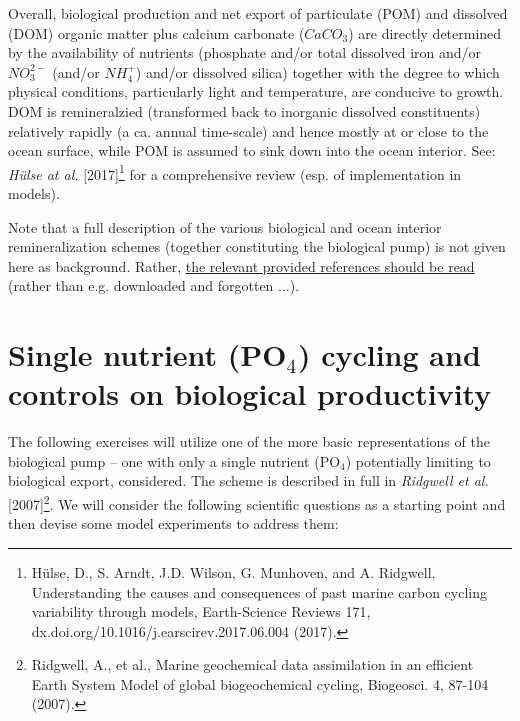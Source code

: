 \documentclass[11pt,fleqn]{book} %
\begin{document}
Overall, biological production and net export of particulate (POM) and dissolved (DOM) organic matter plus calcium carbonate (\(CaCO_{3}\)) are directly determined by the availability of nutrients (phosphate and/or total dissolved iron and/or \(NO^{2-}_{3}\) (and/or \(NH^{+}_{4}\)) and/or dissolved silica) together with the degree to which physical conditions, particularly light and temperature, are conducive to growth. DOM is remineralzied (transformed back to inorganic dissolved constituents) relatively rapidly (a ca. annual time-scale) and hence mostly at or close to the ocean surface, while POM is assumed to sink down into the ocean interior. See: \textit{Hülse at al.} [2017]\footnote{Hülse, D., S. Arndt, J.D. Wilson, G. Munhoven, and A. Ridgwell, Understanding the causes and consequences of past marine carbon cycling variability through models, Earth-Science Reviews 171, dx.doi.org/10.1016/j.earscirev.2017.06.004 (2017).} for a comprehensive review (esp. of implementation in models).

Note that a full description of the various biological and ocean interior remineralization schemes (together constituting the biological pump) is not given here as background. Rather, \uline{the relevant provided references should be read} (rather than e.g. downloaded and forgotten ...).


\newpage


\section{Single nutrient (PO$_{4}$) cycling and controls on biological productivity}

The following exercises  will utilize one of the more basic representations of the biological pump -- one with only a single nutrient (PO$_{4}$) potentially limiting to biological export, considered. The scheme is described in full in \textit{Ridgwell et al.} [2007]\footnote{Ridgwell, A., et al., Marine geochemical data assimilation in an efficient Earth System Model of global biogeochemical cycling, Biogeosci. 4, 87-104 (2007). }. We will consider the following scientific questions as a starting point and then devise some model experiments to address them:
\end{document}
